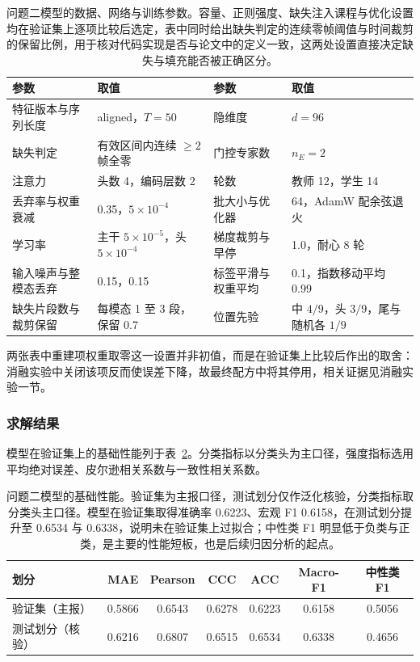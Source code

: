\documentclass[withoutpreface,bwprint]{cumcmthesis}
\begin{document}
\begin{table}[H]
\centering
  \caption{问题二模型的数据、网络与训练参数。容量、正则强度、缺失注入课程与优化设置均在验证集上逐项比较后选定，表中同时给出缺失判定的连续零帧阈值与时间裁剪的保留比例，用于核对代码实现是否与论文中的定义一致，这两处设置直接决定缺失与填充能否被正确区分。}
\label{tab:q2hparam}
\small
\begin{tabular}{@{}p{3.25cm}p{4.15cm}p{3.15cm}p{4.15cm}@{}}
\toprule
参数 & 取值 & 参数 & 取值 \\
\midrule
特征版本与序列长度 & aligned，$T=50$ & 隐维度 & $d=96$ \\
缺失判定 & 有效区间内连续 $\ge2$ 帧全零 & 门控专家数 & $n_E=2$ \\
注意力 & 头数 4，编码层数 2 & 轮数 & 教师 12，学生 14 \\
丢弃率与权重衰减 & 0.35，$5\times10^{-4}$ & 批大小与优化器 & 64，AdamW 配余弦退火 \\
学习率 & 主干 $5\times10^{-5}$，头 $5\times10^{-4}$ & 梯度裁剪与早停 & 1.0，耐心 8 轮 \\
输入噪声与整模态丢弃 & 0.15，0.15 & 标签平滑与权重平均 & 0.1，指数移动平均 0.99 \\
缺失片段数与裁剪保留 & 每模态 1 至 3 段，保留 0.7 & 位置先验 & 中 $4/9$，头 $3/9$，尾与随机各 $1/9$ \\
\bottomrule
\end{tabular}
\end{table}

两张表中重建项权重取零这一设置并非初值，而是在验证集上比较后作出的取舍：消融实验中关闭该项反而使误差下降，故最终配方中将其停用，相关证据见消融实验一节。

\subsubsection{求解结果}

模型在验证集上的基础性能列于表~\ref{tab:q2main}。分类指标以分类头为主口径，强度指标选用平均绝对误差、皮尔逊相关系数与一致性相关系数。

\begin{table}[H]
\centering
  \caption{问题二模型的基础性能。验证集为主报口径，测试划分仅作泛化核验，分类指标取分类头主口径。模型在验证集取得准确率 0.6223、宏观 F1 0.6158，在测试划分提升至 0.6534 与 0.6338，说明未在验证集上过拟合；中性类 F1 明显低于负类与正类，是主要的性能短板，也是后续归因分析的起点。}
\label{tab:q2main}
\begin{tabular}{lcccccc}
\toprule
划分 & MAE & Pearson & CCC & ACC & Macro-F1 & 中性类 F1 \\
\midrule
验证集（主报） & 0.5866 & 0.6543 & 0.6278 & 0.6223 & 0.6158 & 0.5056 \\
测试划分（核验） & 0.6216 & 0.6807 & 0.6515 & 0.6534 & 0.6338 & 0.4656 \\
\bottomrule
\end{tabular}
\end{table}
\end{document}
